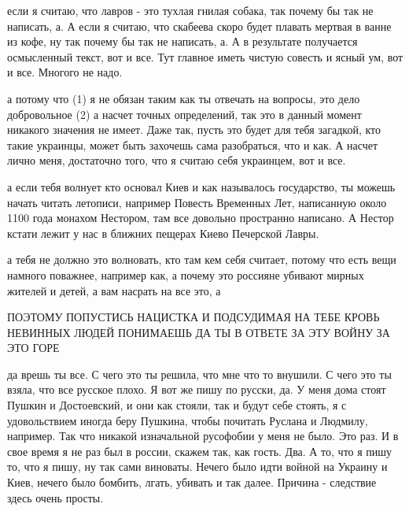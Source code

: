  
 
 
 
 

если я считаю, что лавров - это тухлая гнилая собака, так почему бы так не
написать, а. А если я считаю, что скабеева скоро будет плавать мертвая в ванне
из кофе, ну так почему бы так не написать, а. А в результате получается
осмысленный текст, вот и все. Тут главное иметь чистую совесть и ясный ум, вот
и все. Многого не надо.




а потому что (1) я не обязан таким как ты отвечать на вопросы, это дело
добровольное (2) а насчет точных определений, так это в данный момент никакого
значения не имеет. Даже так, пусть это будет для тебя загадкой, кто такие
украинцы, может быть захочешь сама разобраться, что и как. А насчет лично меня,
достаточно того, что я считаю себя украинцем, вот и все.

а если тебя волнует кто основал Киев и как называлось государство, ты можешь
начать читать летописи, например Повесть Временных Лет, написанную около 1100
года монахом Нестором, там все довольно пространно написано. А Нестор кстати
лежит у нас в ближних пещерах Киево Печерской Лавры.

а тебя не должно это волновать, кто там кем себя считает, потому что есть вещи
намного поважнее, например как, а почему это россияне убивают мирных жителей и
детей, а вам насрать на все это, а

ПОЭТОМУ ПОПУСТИСЬ НАЦИСТКА И ПОДСУДИМАЯ НА ТЕБЕ КРОВЬ НЕВИННЫХ ЛЮДЕЙ ПОНИМАЕШЬ
ДА ТЫ В ОТВЕТЕ ЗА ЭТУ ВОЙНУ ЗА ЭТО ГОРЕ

да врешь ты все. С чего это ты решила, что мне что то внушили. С чего это ты
взяла, что все русское плохо. Я вот же пишу по русски, да. У меня дома стоят
Пушкин и Достоевский, и они как стояли, так и будут себе стоять, я с
удовольствием иногда беру Пушкина, чтобы почитать Руслана и Людмилу, например.
Так что никакой изначальной русофобии у меня не было. Это раз. И в свое время я
не раз был в россии, скажем так, как гость. Два. А то, что я пишу то, что я
пишу, ну так сами виноваты. Нечего было идти войной на Украину и Киев, нечего
было бомбить, лгать, убивать и так далее. Причина - следствие здесь очень
просты.

